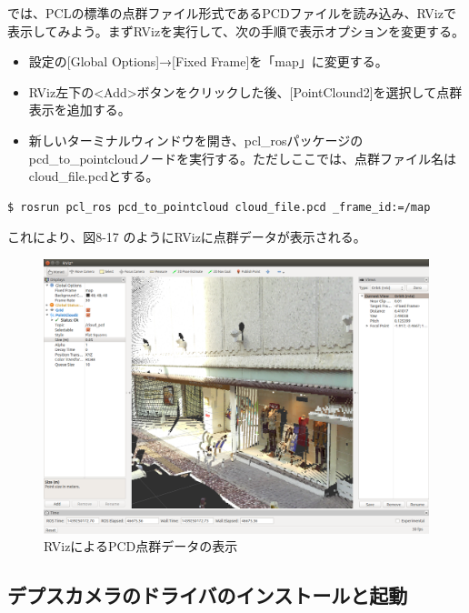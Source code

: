 では、PCLの標準の点群ファイル形式であるPCDファイルを読み込み、RVizで表示してみよう。まずRVizを実行して、次の手順で表示オプションを変更する。

\begin{itemize}
\item 設定の[Global Options]→[Fixed Frame]を「map」に変更する。
\item RViz左下の<Add>ボタンをクリックした後、[PointClound2]を選択して点群表示を追加する。
\item 新しいターミナルウィンドウを開き、pcl\_rosパッケージのpcd\_to\_pointcloudノードを実行する。ただしここでは、点群ファイル名はcloud\_file.pcdとする。
\end{itemize}

\begin{lstlisting}[language=ROS]
$ rosrun pcl_ros pcd_to_pointcloud cloud_file.pcd _frame_id:=/map
\end{lstlisting}

これにより、図8-17 のようにRVizに点群データが表示される。

\begin{figure}[ht]
  \centering
  \includegraphics[width=\columnwidth]{pictures/chapter8/pic_08_16.png}
  \caption{RVizによるPCD点群データの表示}
\end{figure}

\subsection{デプスカメラのドライバのインストールと起動}

